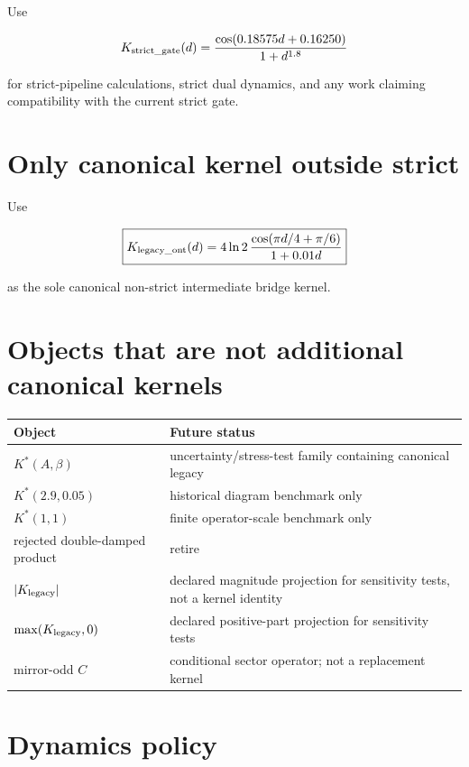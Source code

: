 \documentclass[11pt,a4paper,openany]{report}
\begin{document}
Use

\[
K_{\rm strict\_gate}(d)
=
\frac{\cos(0.18575d+0.16250)}{1+d^{1.8}}
\]

for strict-pipeline calculations, strict dual dynamics, and any work claiming compatibility with the current strict gate.

\section{Only canonical kernel outside strict}

Use

\[
\boxed{
K_{\rm legacy\_ont}(d)
=
4\ln2\,
\frac{\cos(\pi d/4+\pi/6)}{1+0.01d}
}
\]

as the sole canonical non-strict intermediate bridge kernel.

\section{Objects that are not additional canonical kernels}

\begin{center}
\begingroup\small
\setlength{\tabcolsep}{3.5pt}
\renewcommand{\arraystretch}{1.16}
\begin{longtable}{@{}p{}p{}@{}}
\toprule
\textbf{Object} & \textbf{Future status} \\
\midrule
\endhead
\(K^*(A,\beta)\) & uncertainty/\allowbreak{}stress-test family containing canonical legacy \\
\(K^*(2.9,0.05)\) & historical diagram benchmark only \\
\(K^*(1,1)\) & finite operator-scale benchmark only \\
rejected double-damped product & retire \\
\(|K_{\rm legacy}|\) & declared magnitude projection for sensitivity tests, not a kernel identity \\
\(\max(K_{\rm legacy},0)\) & declared positive-part projection for sensitivity tests \\
mirror-odd \(C\) & conditional sector operator; not a replacement kernel \\
\bottomrule
\end{longtable}
\endgroup
\end{center}

\section{Dynamics policy}
\end{document}
